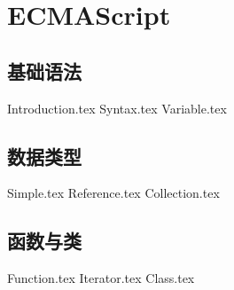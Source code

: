 \documentclass{PionpillNote-book}
\begin{document}
\part{ECMAScript}
\chapter{基础语法}
{Introduction.tex}
{Syntax.tex}
{Variable.tex}
\chapter{数据类型}
{Simple.tex}
{Reference.tex}
{Collection.tex}
\chapter{函数与类}
{Function.tex}
{Iterator.tex}
{Class.tex}
\end{document}
